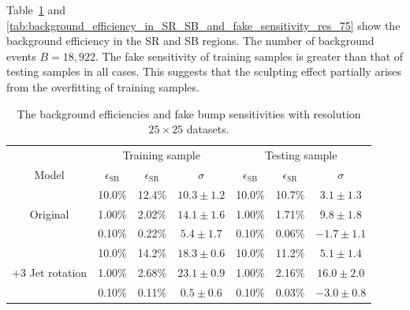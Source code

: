 \documentclass[12pt]{article}
\begin{document}
        Table~\ref{tab:background_efficiency_in_SR_SB_and_fake_sensitivity_res_25} and \ref{tab:background_efficiency_in_SR_SB_and_fake_sensitivity_res_75} show the background efficiency in the SR and SB regions. The number of background events $B = 18,922$. The fake sensitivity of training samples is greater than that of testing samples in all cases. This suggests that the sculpting effect partially arises from the overfitting of training samples.
        \begin{table}[htpb]
            \centering
            \caption{The background efficiencies and fake bump sensitivities with resolution $25\times 25$ datasets.}
            \label{tab:background_efficiency_in_SR_SB_and_fake_sensitivity_res_25}
            \begin{tabular}{c|ccc|ccc}
                                       & \multicolumn{3}{c|}{Training sample}                             & \multicolumn{3}{c}{Testing sample}                               \\
            Model                                  & $\epsilon_{\text{SB}}$ & $\epsilon_{\text{SR}}$ & $\sigma$       & $\epsilon_{\text{SB}}$ & $\epsilon_{\text{SR}}$ & $\sigma$       \\ \hline
            \multirow{3}{*}{Original}              & 10.0\%                 & 12.4\%                 & $10.3 \pm 1.2$ & 10.0\%                 & 10.7\%                 & $3.1 \pm 1.3$  \\
                                                   & 1.00\%                 & 2.02\%                 & $14.1 \pm 1.6$ & 1.00\%                 & 1.71\%                 & $9.8 \pm 1.8$  \\
                                                   & 0.10\%                 & 0.22\%                 & $5.4 \pm 1.7$  & 0.10\%                 & 0.06\%                 & $-1.7 \pm 1.1$ \\ \hline
            \multirow{3}{*}{+3 Jet rotation}       & 10.0\%                 & 14.2\%                 & $18.3 \pm 0.6$ & 10.0\%                 & 11.2\%                 & $5.1 \pm 1.4$  \\
                                                   & 1.00\%                 & 2.68\%                 & $23.1 \pm 0.9$ & 1.00\%                 & 2.16\%                 & $16.0 \pm 2.0$ \\
                                                   & 0.10\%                 & 0.11\%                 & $0.5 \pm 0.6$  & 0.10\%                 & 0.03\%                 & $-3.0 \pm 0.8$ \\ \hline

\end{tabular}
\end{table}
\end{document}
